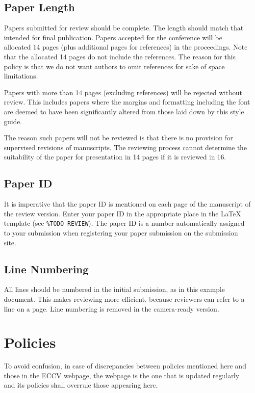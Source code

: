 \documentclass[runningheads]{llncs}
\begin{document}
\subsection{Paper Length}
Papers submitted for review should be complete. 
The length should match that intended for final publication. 
Papers accepted for the conference will be allocated 14 pages (plus additional pages for references) in the proceedings. 
Note that the allocated 14 pages do not include the references. 
The reason for this policy is that we do not want authors to omit references for sake of space limitations.

Papers with more than 14 pages (excluding references) will be rejected without review.
This includes papers where the margins and formatting including the font are deemed to have been significantly altered from those laid down by this style guide.

The reason such papers will not be reviewed is that there is no provision for supervised revisions of manuscripts. 
The reviewing process cannot determine the suitability of the paper for presentation in 14 pages if it is reviewed in 16.


\subsection{Paper ID}
It is imperative that the paper ID is mentioned on each page of the manuscript of the review version.
Enter your paper ID in the appropriate place in the \LaTeX{} template (see \texttt{\%TODO REVIEW}).
The paper ID is a number automatically assigned to your submission when registering your paper submission on the submission site.


\subsection{Line Numbering}
\label{sec:line-numbering}
All lines should be numbered in the initial submission, as in this example document. 
This makes reviewing more efficient, because reviewers can refer to a line on a page. 
Line numbering is removed in the camera-ready version.


\section{Policies}
To avoid confusion, in case of discrepancies between policies mentioned here and those in the ECCV \ECCVyear{} webpage, the webpage is the one that is updated regularly and its policies shall overrule those appearing here. 
\end{document}
